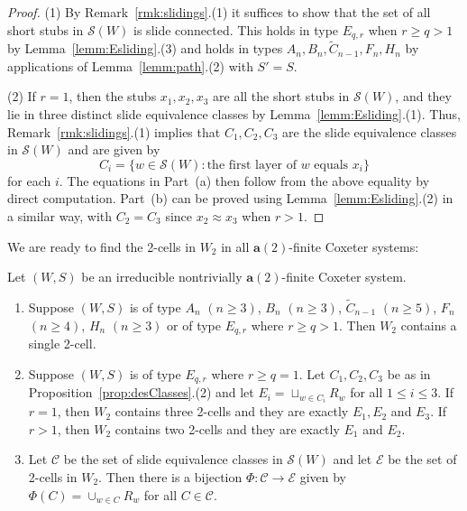 \documentclass[ALCO,Unicode,published]{cedram}
\newcommand{\la}{\mathbf{a}}
\newcommand{\sw}{\mathcal{S}(W)}
\newcommand{\ntatf}{nontrivially $\la(2)$-finite }
\newcommand{\ra}{\rightarrow}
\begin{document}
    \begin{proof}
        (1) By Remark~\ref{rmk:slidings}.(1) it suffices to show that the set of all short stubs in $\sw$
        is slide connected. This holds in type $E_{q,r}$ when $r\ge q>1$ by Lemma~\ref{lemm:Esliding}.(3)
        and holds in types $A_n, B_n, \tilde C_{n-1}, F_n, H_n$ by applications of
        Lemma~\ref{lemm:path}.(2) with $S'=S$.  

        (2) If $r=1$, then the stubs $x_1,x_2,x_3$ are all the short stubs in $\sw$, and they lie in
        three distinct slide equivalence classes by Lemma~\ref{lemm:Esliding}.(1). Thus,
        Remark~\ref{rmk:slidings}.(1) implies that  $C_1, C_2, C_3$ are the slide equivalence classes in
        $\sw$ and are given by \[ C_i=\{w\in \sw: \text{the first layer of $w$ equals $x_i$}\} \]
        for each $i$. The equations in Part~(a) then follow from the above equality by direct
        computation. Part~(b) can be proved using Lemma~\ref{lemm:Esliding}.(2) in a similar way, with
        $C_2=C_3$ since $x_2\approx x_3$ when $r>1$. 
\end{proof}

We are ready to find the 2-cells in $W_2$ in all $\la(2)$-finite Coxeter systems:

\begin{thm}
\label{thm:twoSidedCells}
Let $(W,S)$ be an irreducible \ntatf Coxeter system.
\begin{enumerate}
    \item Suppose $(W,S)$ is of type $A_n$ $(n\ge 3)$, $B_n$ $(n\ge 3)$, $\tilde C_{n-1}$ $(n\ge 5)$, $F_n$ $(n\ge 4)$, $H_n$ $(n\ge
        3)$ or of type $E_{q,r}$ where $r\ge q>1$. Then $W_2$ contains a single 2-cell.
    \item Suppose $(W,S)$ is of type $E_{q,r}$ where $r\ge q=1$. Let $C_1, C_2,C_3$ be as in
        Proposition~\ref{prop:desClasses}.(2) and let $E_i= \sqcup_{w\in C_i}R_w$ for all $1\le i\le 3$. 
        If $r=1$, then $W_2$ contains three 2-cells and they are exactly 
        $E_1, E_2$ and $E_3$. If $r>1$, then $W_2$ contains two 2-cells and they are exactly 
        $E_1$ and $E_2$.
    \item Let $\mathcal{C}$ be the set of slide equivalence classes in $\sw$ and let $\mathcal{E}$
         be the set of 2-cells in $W_2$. Then there is a bijection $\Phi: \mathcal{C}\ra
         \mathcal{E}$ given by $\Phi(C)=\cup_{w\in C}R_w$ for all $C\in \mathcal{C}$. 
\end{enumerate}
\end{thm}
\end{document}
